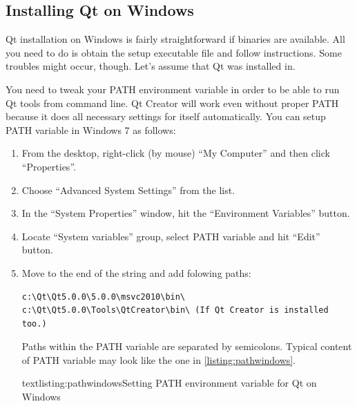 \vfill

\subsection{Installing Qt on Windows}
Qt installation on Windows is fairly straightforward if binaries are available. All you need to do is obtain the setup executable file and follow instructions. Some troubles might occur, though. Let's assume that Qt was installed in.

You need to tweak your PATH environment variable in order to be able to run Qt tools from command line. Qt Creator will work even without proper PATH because it does all necessary settings for itself automatically. You can setup PATH variable in Windows 7 as follows:
\begin{enumerate}
\item From the desktop, right-click (by mouse) \enquote{My Computer} and then click \enquote{Properties}.
\item Choose \enquote{Advanced System Settings} from the list.
\item In the \enquote{System Properties} window, hit the \enquote{Environment Variables} button.
\item Locate \enquote{System variables} group, select PATH variable and hit \enquote{Edit} button.
\item Move to the end of the string and add folowing paths:
\begin{lstlisting}[firstnumber=1,language=text]
c:\Qt\Qt5.0.0\5.0.0\msvc2010\bin\
c:\Qt\Qt5.0.0\Tools\QtCreator\bin\ (If Qt Creator is installed too.)
\end{lstlisting}
Paths within the PATH variable are separated by semicolons. Typical content of PATH variable may look like the one in \autoref{listing:pathwindows}.
\begin{fdoccode}{text}{listing:pathwindows}{Setting PATH environment variable for Qt on Windows}
\end{fdoccode}
\end{enumerate}

